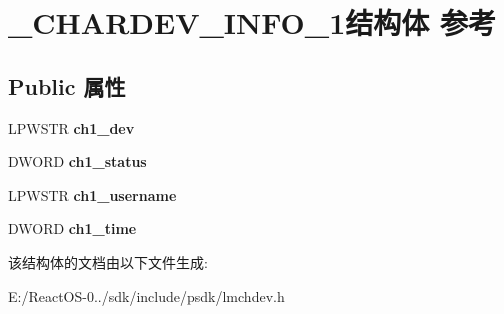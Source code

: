 \hypertarget{struct___c_h_a_r_d_e_v___i_n_f_o__1}{}\section{\+\_\+\+C\+H\+A\+R\+D\+E\+V\+\_\+\+I\+N\+F\+O\+\_\+1结构体 参考}
\label{struct___c_h_a_r_d_e_v___i_n_f_o__1}
\subsection*{Public 属性}
\begin{DoxyCompactItemize}
\item 
\mbox{\label{struct___c_h_a_r_d_e_v___i_n_f_o__1_aa1303c7ed9a2eeb6bee21465f94c30b3}} 
L\+P\+W\+S\+TR {\bfseries ch1\+\_\+dev}
\item 
\mbox{\label{struct___c_h_a_r_d_e_v___i_n_f_o__1_a19aaea22c80484184c558c016c814a59}} 
D\+W\+O\+RD {\bfseries ch1\+\_\+status}
\item 
\mbox{\label{struct___c_h_a_r_d_e_v___i_n_f_o__1_aa156eee22634b1bddce885b244bdc6ea}} 
L\+P\+W\+S\+TR {\bfseries ch1\+\_\+username}
\item 
\mbox{\label{struct___c_h_a_r_d_e_v___i_n_f_o__1_a2706326cb8bf40d5e2a0386e3b09bfe0}} 
D\+W\+O\+RD {\bfseries ch1\+\_\+time}
\end{DoxyCompactItemize}


该结构体的文档由以下文件生成\+:\begin{DoxyCompactItemize}
\item 
E\+:/\+React\+O\+S-\/0../sdk/include/psdk/lmchdev.\+h\end{DoxyCompactItemize}
